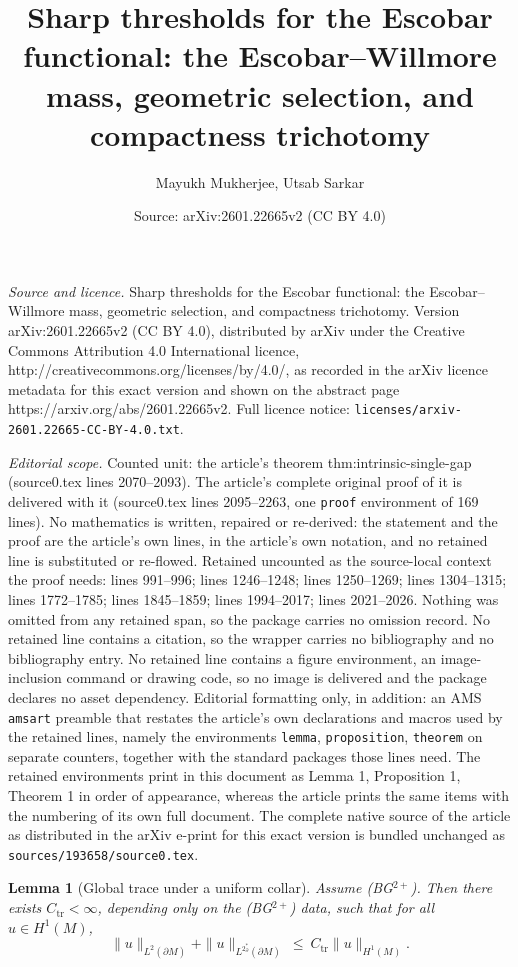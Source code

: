 \documentclass[10pt,a4paper]{amsart}
\title{Sharp thresholds for the Escobar functional: the Escobar--Willmore mass, geometric selection, and compactness trichotomy}
\author{Mayukh Mukherjee, Utsab Sarkar}
\date{Source: arXiv:2601.22665v2 (CC BY 4.0)}
\newtheorem{lemma}{Lemma}
\begin{document}
\maketitle

\noindent\emph{Source and licence.} Sharp thresholds for the Escobar functional: the Escobar--Willmore mass, geometric selection, and compactness trichotomy. Version arXiv:2601.22665v2 (CC BY 4.0), distributed by arXiv under the Creative Commons Attribution 4.0 International licence, http://creativecommons.org/licenses/by/4.0/, as recorded in the arXiv licence metadata for this exact version and shown on the abstract page https://arxiv.org/abs/2601.22665v2. Full licence notice: \texttt{licenses/arxiv-2601.22665-CC-BY-4.0.txt}.\par\smallskip

\noindent\textit{Editorial scope.} Counted unit: the article's theorem thm:intrinsic-single-gap (source0.tex lines 2070--2093). The article's complete original proof of it is delivered with it (source0.tex lines 2095--2263, one \texttt{proof} environment of 169 lines). No mathematics is written, repaired or re-derived: the statement and the proof are the article's own lines, in the article's own notation, and no retained line is substituted or re-flowed.  Retained uncounted as the source-local context the proof needs: lines 991--996; lines 1246--1248; lines 1250--1269; lines 1304--1315; lines 1772--1785; lines 1845--1859; lines 1994--2017; lines 2021--2026.  Nothing was omitted from any retained span, so the package carries no omission record.  No retained line contains a citation, so the wrapper carries no bibliography and no bibliography entry.  No retained line contains a figure environment, an image-inclusion command or drawing code, so no image is delivered and the package declares no asset dependency.  Editorial formatting only, in addition: an AMS \texttt{amsart} preamble that restates the article's own declarations and macros used by the retained lines, namely the environments \texttt{lemma}, \texttt{proposition}, \texttt{theorem} on separate counters, together with the standard packages those lines need.  The retained environments print in this document as Lemma 1, Proposition 1, Theorem 1 in order of appearance, whereas the article prints the same items with the numbering of its own full document.  The complete native source of the article as distributed in the arXiv e-print for this exact version is bundled unchanged as \texttt{sources/193658/source0.tex}.
\begin{lemma}[Global trace under a uniform collar]\label{lem:global-trace}
Assume \textup{(BG$^{2+}$)}. Then there exists $C_{\mathrm{tr}}<\infty$, depending only on the \textup{(BG$^{2+}$)} data, such that for all $u\in H^1(M)$,
\[
\|u\|_{L^2(\partial M)} + \|u\|_{L^{2^*_\partial}(\partial M)} \ \le\ C_{\mathrm{tr}}\|u\|_{H^1(M)}.
\]
\end{lemma}
\end{document}

